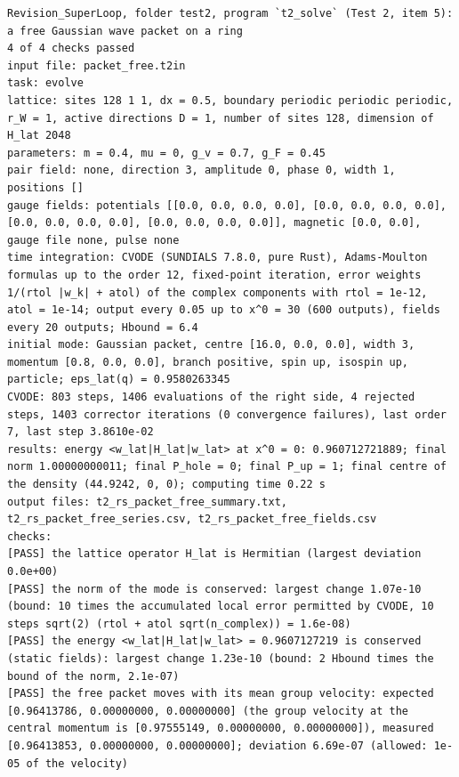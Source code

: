 \documentclass[
  10pt,
]{article}
\begin{document}
\begin{verbatim}
Revision_SuperLoop, folder test2, program `t2_solve` (Test 2, item 5): a free Gaussian wave packet on a ring
4 of 4 checks passed
input file: packet_free.t2in
task: evolve
lattice: sites 128 1 1, dx = 0.5, boundary periodic periodic periodic, r_W = 1, active directions D = 1, number of sites 128, dimension of H_lat 2048
parameters: m = 0.4, mu = 0, g_v = 0.7, g_F = 0.45
pair field: none, direction 3, amplitude 0, phase 0, width 1, positions []
gauge fields: potentials [[0.0, 0.0, 0.0, 0.0], [0.0, 0.0, 0.0, 0.0], [0.0, 0.0, 0.0, 0.0], [0.0, 0.0, 0.0, 0.0]], magnetic [0.0, 0.0], gauge file none, pulse none
time integration: CVODE (SUNDIALS 7.8.0, pure Rust), Adams-Moulton formulas up to the order 12, fixed-point iteration, error weights 1/(rtol |w_k| + atol) of the complex components with rtol = 1e-12, atol = 1e-14; output every 0.05 up to x^0 = 30 (600 outputs), fields every 20 outputs; Hbound = 6.4
initial mode: Gaussian packet, centre [16.0, 0.0, 0.0], width 3, momentum [0.8, 0.0, 0.0], branch positive, spin up, isospin up, particle; eps_lat(q) = 0.9580263345
CVODE: 803 steps, 1406 evaluations of the right side, 4 rejected steps, 1403 corrector iterations (0 convergence failures), last order 7, last step 3.8610e-02
results: energy <w_lat|H_lat|w_lat> at x^0 = 0: 0.960712721889; final norm 1.00000000011; final P_hole = 0; final P_up = 1; final centre of the density (44.9242, 0, 0); computing time 0.22 s
output files: t2_rs_packet_free_summary.txt, t2_rs_packet_free_series.csv, t2_rs_packet_free_fields.csv
checks:
[PASS] the lattice operator H_lat is Hermitian (largest deviation 0.0e+00)
[PASS] the norm of the mode is conserved: largest change 1.07e-10 (bound: 10 times the accumulated local error permitted by CVODE, 10 steps sqrt(2) (rtol + atol sqrt(n_complex)) = 1.6e-08)
[PASS] the energy <w_lat|H_lat|w_lat> = 0.9607127219 is conserved (static fields): largest change 1.23e-10 (bound: 2 Hbound times the bound of the norm, 2.1e-07)
[PASS] the free packet moves with its mean group velocity: expected [0.96413786, 0.00000000, 0.00000000] (the group velocity at the central momentum is [0.97555149, 0.00000000, 0.00000000]), measured [0.96413853, 0.00000000, 0.00000000]; deviation 6.69e-07 (allowed: 1e-05 of the velocity)
\end{verbatim}
\end{document}

